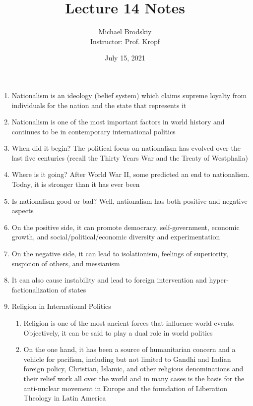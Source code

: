 \documentclass[12pt]{article}
\title{Lecture 14 Notes}
\date{July 15, 2021}
\author{Michael Brodskiy\\ \small Instructor: Prof. Kropf}
\begin{document}
    \maketitle

    \begin{enumerate}

      \item Nationalism is an ideology (belief system) which claims supreme loyalty from individuals for the nation and the state that represents it

      \item Nationalism is one of the most important factors in world history and continues to be in contemporary international politics

      \item When did it begin? The political focus on nationalism has evolved over the last five centuries (recall the Thirty Years War and the Treaty of Westphalia)

      \item Where is it going? After World War II, some predicted an end to nationalism. Today, it is stronger than it has ever been

      \item Is nationalism good or bad? Well, nationalism has both positive and negative aspects

      \item On the positive side, it can promote democracy, self-government, economic growth, and social/political/economic diversity and experimentation

      \item On the negative side, it can lead to isolationism, feelings of superiority, suspicion of others, and messianism 

      \item It can also cause instability and lead to foreign intervention and hyper-factionalization of states

      \item Religion in International Politics

        \begin{enumerate}

          \item Religion is one of the most ancient forces that influence world events.  Objectively, it can be said to play a dual role in world politics

          \item On the one hand, it has been a source of humanitarian concern and a vehicle for pacifism, including but not limited to Gandhi and Indian foreign policy, Christian, Islamic, and other religious denominations and their relief work all over the world and in many cases is the basis for the anti-nuclear movement in Europe and the foundation of Liberation Theology in Latin America


\end{enumerate}
\end{enumerate}
\end{document}
